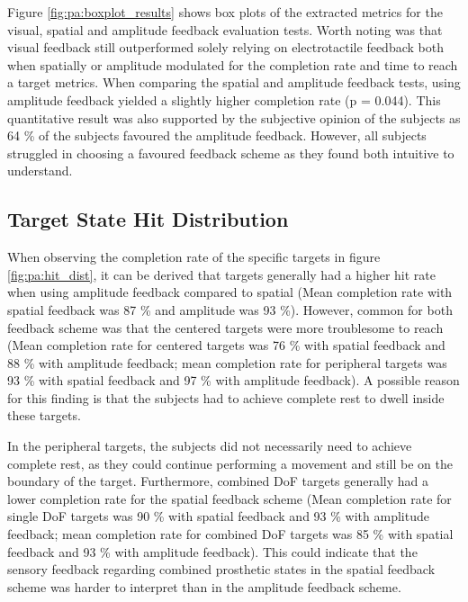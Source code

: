 Figure \ref{fig:pa:boxplot_results} shows box plots of the extracted metrics for the visual, spatial and amplitude feedback evaluation tests. Worth noting was that visual feedback still outperformed solely relying on electrotactile feedback both when spatially or amplitude modulated for the completion rate and time to reach a target metrics. When comparing the spatial and amplitude feedback tests, using amplitude feedback yielded a slightly higher completion rate (p = 0.044). This quantitative result was also supported by the subjective opinion of the subjects as 64 \% of the subjects favoured the amplitude feedback. However, all subjects struggled in choosing a favoured feedback scheme as they found both intuitive to understand. 


\subsection{Target State Hit Distribution}

When observing the completion rate of the specific targets in figure \ref{fig:pa:hit_dist}, it can be derived that targets generally had a higher hit rate when using amplitude feedback compared to spatial (Mean completion rate with spatial feedback was 87 \% and amplitude was 93 \%). However, common for both feedback scheme was that the centered targets were more troublesome to reach (Mean completion rate for centered targets was 76 \% with spatial feedback and 88 \% with amplitude feedback; mean completion rate for peripheral targets was 93 \% with spatial feedback and 97 \% with amplitude feedback). A possible reason for this finding is that the subjects had to achieve complete rest to dwell inside these targets. 

In the peripheral targets, the subjects did not necessarily need to achieve complete rest, as they could continue performing a movement and still be on the boundary of the target. Furthermore, combined DoF targets generally had a lower completion rate for the spatial feedback scheme (Mean completion rate for single DoF targets was 90 \% with spatial feedback and 93 \% with amplitude feedback; mean completion rate for combined DoF targets was 85 \% with spatial feedback and 93 \% with amplitude feedback). This could indicate that the sensory feedback regarding combined prosthetic states in the spatial feedback scheme was harder to interpret than in the amplitude feedback scheme. 


